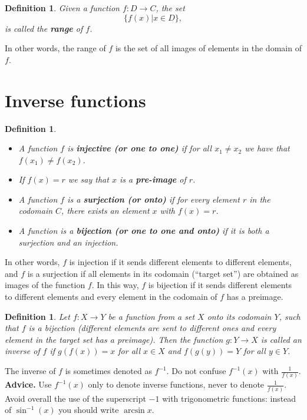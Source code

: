 \documentclass[12pt]{book}
\newtheorem{definition}[theorem]{Definition}
\renewcommand{\emph}{\textbf}
\begin{document}
\begin{definition}
Given a function $f:D\to C$, the set 
\[
 \{f(x) | x\in D \},
\]
is called the \emph{range} of $f$. 
\end{definition}
In other words, the range of $f$ is the set of all images of elements in the domain of $f$.
\section{Inverse functions}

\begin{definition} ~
\begin{itemize}
\item {} A function $f$ is \emph{injective (or one to one)} if  for all $x_1\neq x_2$ we have that $f(x_1)\neq f(x_2)$. 
\item {} If $f(x)=r$ we say that $x$ is a \emph{pre-image} of $r$.
\item {}
A function $f$ is a \emph{surjection (or onto)} if for every element $r$ in the codomain $C$, there exists an element $x$ with $f(x)=r$.
\item {} A function is a \emph{bijection (or one to one and onto)} if it is both a surjection and an injection.
\end{itemize}
\end{definition}
In other words, $f$ is injection if it sends different elements to different elements, and $f$ is a surjection if all elements in its  codomain (``target set'') are obtained as images of the function $f$. In this way, $f$ is bijection if it sends different elements to different elements and every element in the codomain of $f$ has a preimage.
\begin{definition}
Let $f:X\to Y$ be a function from a set $X$ onto its codomain $Y$, such that $f$ is a bijection (different elements are sent to different ones and every element in the target set has a preimage). Then the function $g: Y\to X$ is called an inverse of $f$ if $g(f(x))=x$ for all $x\in X$ and $f(g(y))=Y$ for all $y\in Y$. 
\end{definition}

The inverse of $f$ is sometimes denoted as $f^{-1}$. Do not confuse $f^{-1}(x)$ with $\frac{1}{f(x)}$. \textbf{Advice.} Use $f^{-1}(x)$ only to denote inverse functions, never to denote $\frac{1}{f(x)}$. Avoid overall the use of the superscript $-1$ with trigonometric functions: instead of  $\sin^{-1}(x)$ you should write $\arcsin x$.
\end{document}
